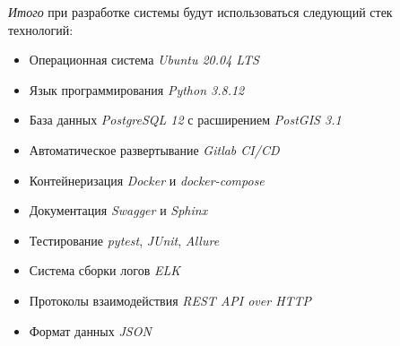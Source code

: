 \noindent \textit{Итого} при разработке системы будут использоваться следующий стек технологий:
\begin{itemize}
    \item Операционная система \textit{Ubuntu 20.04 LTS}
    \item Язык программирования \textit{Python 3.8.12}
    \item База данных \textit{PostgreSQL 12} с расширением \textit{PostGIS 3.1}
    \item Автоматическое развертывание \textit{Gitlab CI/CD}
    \item Контейнеризация \textit{Docker} и \textit{docker-compose}
    \item Документация \textit{Swagger} и \textit{Sphinx}
    \item Тестирование \textit{pytest}, \textit{JUnit}, \textit{Allure}
    \item Система сборки логов \textit{ELK}
    \item Протоколы взаимодействия \textit{REST API over HTTP}
    \item Формат данных \textit{JSON}
\end{itemize}